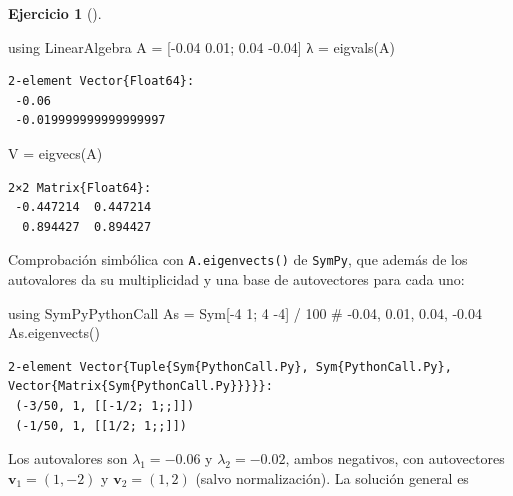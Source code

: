 \documentclass[
  spanish,
  a4paper,
]{scrreport}
\newenvironment{Shaded}{\begin{snugshade}}{\end{snugshade}}
\newcommand{\BuiltInTok}[1]{\textcolor[rgb]{0.00,0.23,0.31}{#1}}
\newcommand{\CommentTok}[1]{\textcolor[rgb]{0.37,0.37,0.37}{#1}}
\newcommand{\FloatTok}[1]{\textcolor[rgb]{0.68,0.00,0.00}{#1}}
\newcommand{\FunctionTok}[1]{\textcolor[rgb]{0.28,0.35,0.67}{#1}}
\newcommand{\ImportTok}[1]{\textcolor[rgb]{0.00,0.46,0.62}{#1}}
\newcommand{\NormalTok}[1]{\textcolor[rgb]{0.00,0.23,0.31}{#1}}
\newcommand{\OperatorTok}[1]{\textcolor[rgb]{0.37,0.37,0.37}{#1}}
\theoremstyle{definition}
\newtheorem{exercise}{Ejercicio}[chapter]
\theoremstyle{remark}
\begin{document}
\begin{exercise}[]
\begin{enumerate}
\begin{tcolorbox}
\begin{Shaded}
\begin{Highlighting}[]
\ImportTok{using} \BuiltInTok{LinearAlgebra}
\NormalTok{A }\OperatorTok{=}\NormalTok{ [}\OperatorTok{{-}}\FloatTok{0.04} \FloatTok{0.01}\NormalTok{; }\FloatTok{0.04} \OperatorTok{{-}}\FloatTok{0.04}\NormalTok{]}
\NormalTok{λ }\OperatorTok{=} \FunctionTok{eigvals}\NormalTok{(A)}
\end{Highlighting}
\end{Shaded}

\begin{verbatim}
2-element Vector{Float64}:
 -0.06
 -0.019999999999999997
\end{verbatim}

\begin{Shaded}
\begin{Highlighting}[]
\NormalTok{V }\OperatorTok{=} \FunctionTok{eigvecs}\NormalTok{(A)}
\end{Highlighting}
\end{Shaded}

\begin{verbatim}
2×2 Matrix{Float64}:
 -0.447214  0.447214
  0.894427  0.894427
\end{verbatim}

  Comprobación simbólica con \texttt{A.eigenvects()} de \texttt{SymPy},
  que además de los autovalores da su multiplicidad y una base de
  autovectores para cada uno:

\begin{Shaded}
\begin{Highlighting}[]
\ImportTok{using} \BuiltInTok{SymPyPythonCall}
\NormalTok{As }\OperatorTok{=}\NormalTok{ Sym[}\OperatorTok{{-}}\FloatTok{4} \FloatTok{1}\NormalTok{; }\FloatTok{4} \OperatorTok{{-}}\FloatTok{4}\NormalTok{] }\OperatorTok{/} \FloatTok{100}  \CommentTok{\# {-}0.04, 0.01, 0.04, {-}0.04}
\NormalTok{As.}\FunctionTok{eigenvects}\NormalTok{()}
\end{Highlighting}
\end{Shaded}

\begin{verbatim}
2-element Vector{Tuple{Sym{PythonCall.Py}, Sym{PythonCall.Py}, Vector{Matrix{Sym{PythonCall.Py}}}}}:
 (-3/50, 1, [[-1/2; 1;;]])
 (-1/50, 1, [[1/2; 1;;]])
\end{verbatim}

  Los autovalores son \(\lambda_1 = -0.06\) y \(\lambda_2 = -0.02\),
  ambos negativos, con autovectores \(\mathbf{v}_1 = (1, -2)\) y
  \(\mathbf{v}_2 = (1, 2)\) (salvo normalización). La solución general
  es


\end{tcolorbox}
\end{enumerate}
\end{exercise}
\end{document}
